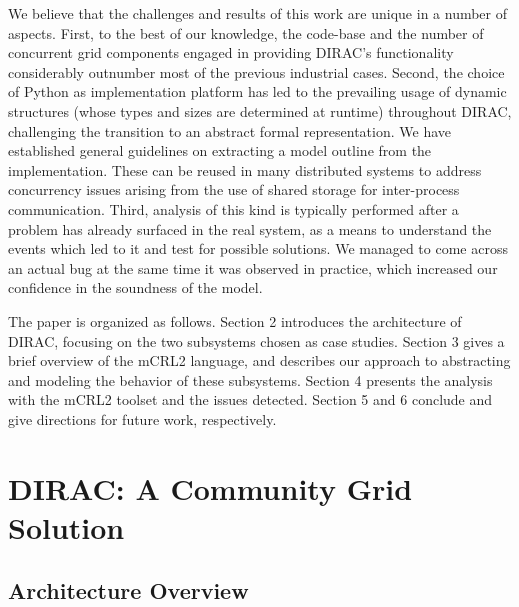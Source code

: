 \documentclass[sort&compress,preprint,3p]{elsarticle}
\begin{document}
We believe that the challenges and results of this work are unique in
a number of aspects. First, to the best of our knowledge, the code-base
and the number of concurrent grid components engaged in providing DIRAC's
functionality considerably outnumber most of the previous industrial cases. Second,
the choice of Python as implementation platform has led to the prevailing
usage of dynamic structures (whose types and sizes are determined at
runtime) throughout DIRAC, challenging the transition to an abstract
formal representation. We have established general
guidelines on extracting a model outline from the implementation. These
can be reused in many distributed systems to address concurrency issues arising 
from the use of shared storage for inter-process communication. Third,
analysis of this kind is typically performed after a problem has already
surfaced in the real system, as a means to understand the events which
led to it and test for possible solutions. We managed to come across an
actual bug at the same time it was observed in practice, which increased
our confidence in the soundness of the model.

The paper is organized as follows. Section 2 introduces the architecture
of DIRAC, focusing on the two subsystems chosen as case studies. Section 3 gives a brief
overview of the mCRL2 language, and describes our approach to abstracting
and modeling the behavior of these subsystems. Section 4 presents the
analysis with the mCRL2 toolset and the issues detected. Section 5 and 6
conclude and give directions for future work, respectively. 

\section{DIRAC: A Community Grid Solution}
\label{sec:Section_2}
\subsection{Architecture Overview}
\end{document}
